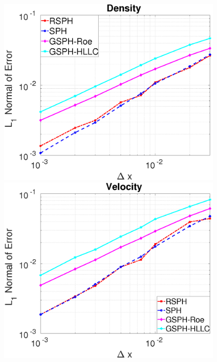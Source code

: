 \documentclass[review]{elsarticle}
\begin{document}
\begin{figure}[H]
    \centering
    \begin{minipage}{.332\textwidth}
        \centering
        \includegraphics[width=0.99 \textwidth]{./Figures/Accuracy-des}
    \end{minipage}%
    \begin{minipage}{.332 \textwidth}
        \centering
        \includegraphics[width=0.99 \textwidth]{./Figures/Accuracy-vel}
    \end{minipage}%
    \begin{minipage}{.332\textwidth}

\end{minipage}
\end{figure}
\end{document}
